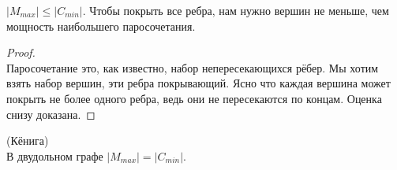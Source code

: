 \begin{prop}
	$\lvert M_{max} \rvert \leq \lvert C_{min} \rvert$.
	Чтобы покрыть все ребра, нам нужно вершин не меньше, чем мощность наибольшего паросочетания.
\end{prop}

\begin{proof} \ \\
	Паросочетание это, как известно, набор непересекающихся рёбер. Мы хотим взять набор вершин, эти ребра покрывающий. Ясно что каждая вершина может покрыть не более одного ребра, ведь они не пересекаются по концам. Оценка снизу доказана.
\end{proof}

\begin{theorem} (Кёнига) \\
	В двудольном графе $\lvert M_{max} \rvert = \lvert C_{min} \rvert$.
\end{theorem}

